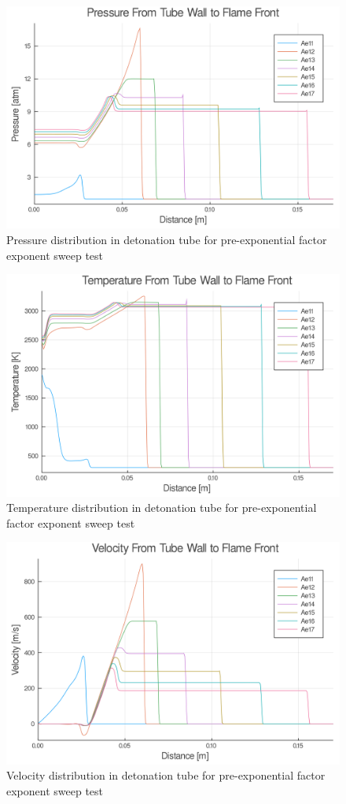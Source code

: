 \begin{figure}
\centering
\includegraphics[width=0.85\linewidth]{./figs/Atest/p.png}
\caption{Pressure distribution in detonation tube for pre-exponential factor exponent sweep test}
\label{fig:atestp}
\end{figure}

\begin{figure}
\centering
\includegraphics[width=0.85\linewidth]{./figs/Atest/t.png}
\caption{Temperature distribution in detonation tube for pre-exponential factor exponent sweep test}
\label{fig:atestt}
\end{figure}

\begin{figure}
\centering
\includegraphics[width=0.85\linewidth]{./figs/Atest/u.png}
\caption{Velocity distribution in detonation tube for pre-exponential factor exponent sweep test}
\label{fig:atestu}
\end{figure}


